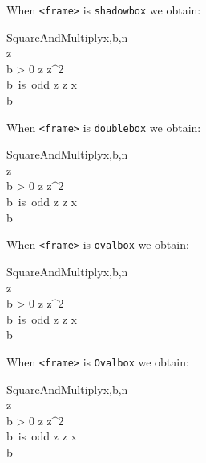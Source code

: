 \documentclass{article}
\begin{document}
\medskip

\noindent When \verb+<frame>+ is \verb+shadowbox+ we obtain:

\begin{pseudocode}[shadowbox]{SquareAndMultiply}{x,b,n}
 \\
 z\\
 \WHILE b > 0 \DO
 \BEGIN
  z \GETS z^2  \\
  \IF b\mbox{ is odd} 
    \THEN z \GETS z \cdot x   \\
    b \GETS {}
 \END\\
\end{pseudocode}

\noindent When \verb+<frame>+ is \verb+doublebox+ we obtain:

\begin{pseudocode}[doublebox]{SquareAndMultiply}{x,b,n}
 \\
 z\\
 \WHILE b > 0 \DO
 \BEGIN
  z \GETS z^2  \\
  \IF b\mbox{ is odd} 
    \THEN z \GETS z \cdot x   \\
    b \GETS {}
 \END\\
\end{pseudocode}

\noindent When \verb+<frame>+ is \verb+ovalbox+ we obtain:

\begin{pseudocode}[ovalbox]{SquareAndMultiply}{x,b,n}
 \\
 z\\
 \WHILE b > 0 \DO
 \BEGIN
  z \GETS z^2  \\
  \IF b\mbox{ is odd} 
    \THEN z \GETS z \cdot x   \\
    b \GETS {}
 \END\\
\end{pseudocode}

\noindent When \verb+<frame>+ is \verb+Ovalbox+ we obtain:

\begin{pseudocode}[Ovalbox]{SquareAndMultiply}{x,b,n}
 \\
 z\\
 \WHILE b > 0 \DO
 \BEGIN
  z \GETS z^2  \\
  \IF b\mbox{ is odd} 
    \THEN z \GETS z \cdot x   \\
    b \GETS {}
 \END\\
\end{pseudocode}
\end{document}
